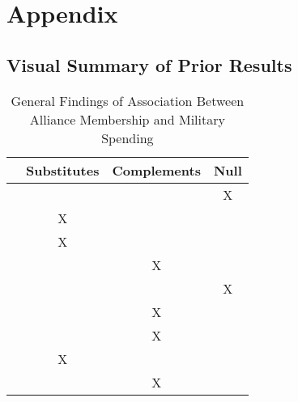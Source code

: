 \documentclass[12pt]{article}
\begin{document}
\section*{Appendix}

\subsection*{Visual Summary of Prior Results} 


\begin{table}[hbt!]
\begin{tabular}{lccc}
     & Substitutes & Complements & Null \\
\hline
\citet{MostSiverson1987} &  &  & X \\
\citet{Morrow1993} & X &  &  \\ 
\citet{Conybeare1994} & X & &  \\
\citet{Diehl1994} &  & X &  \\
\citet{Goldsmith2003} &  &  & X \\
\citet{MorganPalmer2006} &  & X & \\ 
\citet{QuirozFlores2011} &  & X &  \\ 
\citet{DigiuseppePoast2016} & X & & \\ 
\citet{Horowitzetal2017} &  & X & \\ 
\hline
\end{tabular}
\caption{General Findings of Association Between Alliance Membership and Military Spending}
\end{table}









  
% 
\end{document}
